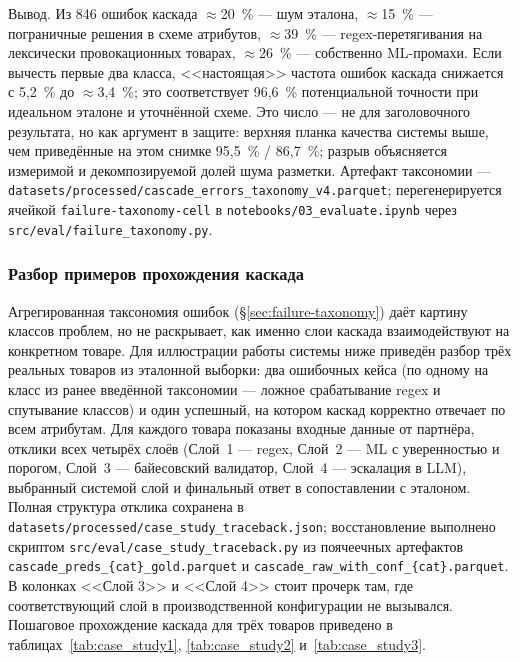 Вывод. Из 846 ошибок каскада $\approx$20~\% --- шум эталона, $\approx$15~\% --- пограничные решения в схеме атрибутов, $\approx$39~\% --- regex-перетягивания на лексически провокационных товарах, $\approx$26~\% --- собственно ML-промахи. Если вычесть первые два класса, <<настоящая>> частота ошибок каскада снижается с 5,2~\% до $\approx$3,4~\%; это соответствует 96,6~\% потенциальной точности при идеальном эталоне и уточнённой схеме. Это число --- не для заголовочного результата, но как аргумент в защите: верхняя планка качества системы выше, чем приведённые на этом снимке 95,5~\% / 86,7~\%; разрыв объясняется измеримой и декомпозируемой долей шума разметки. Артефакт таксономии --- \texttt{datasets/processed/cascade\_errors\_taxonomy\_v4.parquet}; перегенерируется ячейкой \texttt{failure-taxonomy-cell} в \texttt{notebooks/03\_evaluate.ipynb} через \texttt{src/eval/failure\_taxonomy.py}.

\subsubsection{Разбор примеров прохождения каскада}
\label{sec:case-study}

Агрегированная таксономия ошибок (§\ref{sec:failure-taxonomy}) даёт картину классов проблем, но не раскрывает, как именно слои каскада взаимодействуют на конкретном товаре. Для иллюстрации работы системы ниже приведён разбор трёх реальных товаров из эталонной выборки: два ошибочных кейса (по одному на класс из ранее введённой таксономии --- ложное срабатывание regex и спутывание классов) и один успешный, на котором каскад корректно отвечает по всем атрибутам. Для каждого товара показаны входные данные от партнёра, отклики всех четырёх слоёв (Слой~1 --- regex, Слой~2 --- ML с уверенностью и порогом, Слой~3 --- байесовский валидатор, Слой~4 --- эскалация в LLM), выбранный системой слой и финальный ответ в сопоставлении с эталоном. Полная структура отклика сохранена в \texttt{datasets/processed/case\_study\_traceback.json}; восстановление выполнено скриптом \texttt{src/eval/case\_study\_traceback.py} из поячеечных артефактов \texttt{cascade\_preds\_\{cat\}\_gold.parquet} и \texttt{cascade\_raw\_with\_conf\_\{cat\}.parquet}. В колонках <<Слой 3>> и <<Слой 4>> стоит прочерк там, где соответствующий слой в производственной конфигурации не вызывался. Пошаговое прохождение каскада для трёх товаров приведено в таблицах~\ref{tab:case_study1}, \ref{tab:case_study2} и~\ref{tab:case_study3}.



